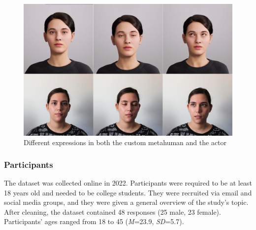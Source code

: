 \begin{figure}[h!]
\includegraphics[width=\textwidth]{figures/personavatar.jpg}
\centering
\caption{Different expressions in both the custom metahuman and the actor}
\label{fig:customMeta}
\end{figure}

\subsubsection{Participants}
The dataset was collected online in 2022. Participants were required to be at least 18 years old and needed to be college students. They were recruited via email and social media groups, and they were given a general overview of the study's topic. After cleaning, the dataset contained 48 responses (25 male, 23 female). Participants’ ages ranged from 18 to 45 (\textit{M}=23.9, \textit{SD}=5.7).

%    
%    
%    

